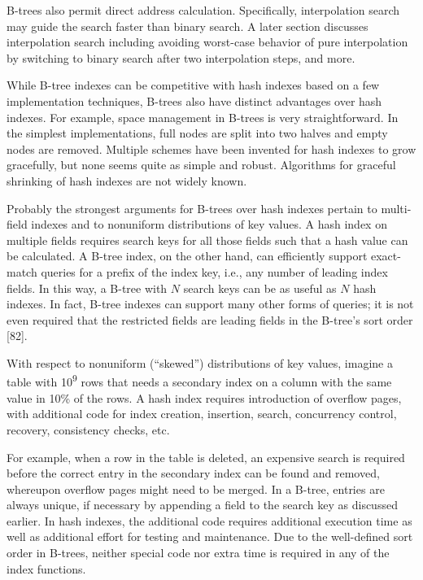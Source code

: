 B-trees also permit direct address calculation. Specifically,
interpolation search may guide the search faster than binary search. A
later section discusses interpolation search including avoiding
worst-case behavior of pure interpolation by switching to binary search
after two interpolation steps, and more.

While B-tree indexes can be competitive with hash indexes based on a few
implementation techniques, B-trees also have distinct advantages over
hash indexes. For example, space management in B-trees is very
straightforward. In the simplest implementations, full nodes are split
into two halves and empty nodes are removed. Multiple schemes have been
invented for hash indexes to grow gracefully, but none seems quite as
simple and robust. Algorithms for graceful shrinking of hash indexes are
not widely known.

Probably the strongest arguments for B-trees over hash indexes pertain
to multi-field indexes and to nonuniform distributions of key values. A
hash index on multiple fields requires search keys for all those fields
such that a hash value can be calculated. A B-tree index, on the other
hand, can efficiently support exact-match queries for a prefix of the
index key, i.e., any number of leading index fields. In this way, a
B-tree with $N$ search keys can be as useful as $N$ hash
indexes. In fact, B-tree indexes can support many other forms of
queries; it is not even required that the restricted fields are leading
fields in the B-tree's sort order {[}82{]}.

With respect to nonuniform (``skewed'') distributions of key values,
imagine a table with 10\textsuperscript{9} rows that needs a secondary
index on a column with the same value in 10\% of the rows. A hash index
requires introduction of overflow pages, with additional code for index
creation, insertion, search, concurrency control, recovery, consistency
checks, etc.

For example, when a row in the table is deleted, an expensive search is
required before the correct entry in the secondary index can be found
and removed, whereupon overflow pages might need to be merged. In a
B-tree, entries are always unique, if necessary by appending a field to
the search key as discussed earlier. In hash indexes, the additional
code requires additional execution time as well as additional effort for
testing and maintenance. Due to the well-defined sort order in B-trees,
neither special code nor extra time is required in any of the index
functions.

